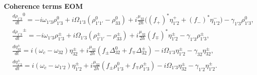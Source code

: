 \documentclass[10pt,letterpaper]{article}
\begin{document}
\textbf{Coherence terms EOM}
\begin{align}
&\frac{d \rho_{1'3}}{d t}^0  = -i\omega_{1'3}\rho_{1'3}^0 +i \Omega_{1'3}(\rho_{1'1'}^{0} - \rho_{33}^{0}) +i\frac{\mu_{32}}{2 \hbar}\big ((f_{+})^*\eta_{1'2}^{+}+(f_{-})^*\eta_{1'2}^{-} \big ) -\gamma_{1'3}\rho_{1'3}^{0} ,\nonumber  \\
&\frac{d \rho_{1'3}}{d t} ^\pm = -i\omega_{1'3}\rho_{1'3}^\pm  +i\Omega_{1'3}(\rho_{1'1'}^{\pm} - \rho_{33}^{\pm}) +i \frac{\mu_{32}}{2 \hbar} (f_{\mp})^* \eta_{1'2}^{\pm} 
- \gamma_{1'3} \rho_{1'3}^{\pm} ,\nonumber\\
&\frac{d \eta_{32}^{\pm}}{d t}   = i(\omega_c - \omega_{32})\eta_{32}^{\pm} +i \frac{\mu_{32}}{2\hbar}(  f_{\pm}\Delta_{32}^{0} + f_{\mp}\Delta_{32}^{\pm} ) - i\Omega_{1'3}\eta_{1'2}^{\pm}
- \gamma_{32}\eta_{32}^\pm ,\nonumber \\
&\frac{d \eta_{1'2}^\pm}{d t}  = i(\omega_c - \omega_{1'2})\eta_{1'2}^{\pm} +i \frac{\mu_{32}}{2\hbar}(f_{\pm }\rho_{1'3}^0 + f_{\mp} \rho_{1'3}^{\pm}) -  i\Omega_{1'3}\eta_{32}^{\pm}
- \gamma_{1'2}\eta_{1'2}^\pm.
\end{align}
\end{document}
